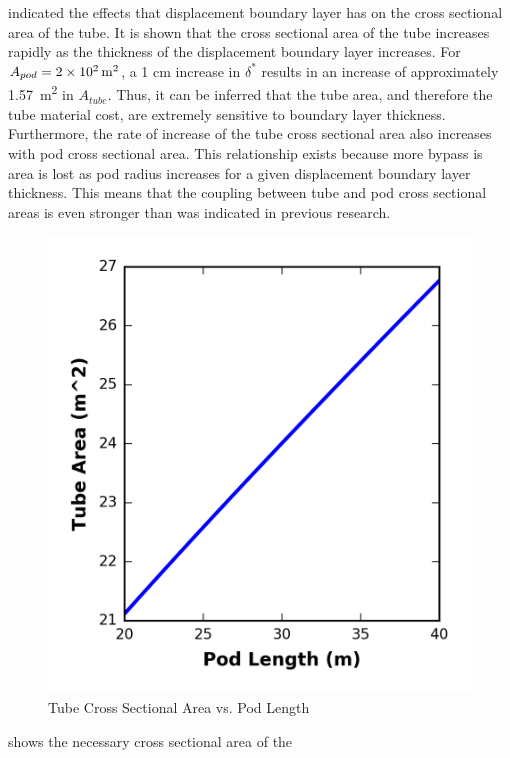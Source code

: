  indicated the effects that
displacement boundary layer has on the cross sectional area of the tube.
It is shown that the cross sectional area of the tube increases rapidly as the
thickness of the displacement boundary layer increases.
For $A_{pod} = \SI{2d2}{\metre\squared}$, a 1 cm increase in $\delta^{*}$
results in an increase of approximately \SI{1.57}{\metre\squared} in $A_{tube}$.
Thus, it can be inferred that the tube area, and therefore the tube material cost,
are extremely sensitive to boundary layer thickness. Furthermore, the rate of
increase of the tube cross sectional area also increases with pod cross sectional area.
This relationship exists because more bypass is area is lost as pod radius
increases for a given displacement boundary layer thickness. This means that
the coupling between tube and pod cross sectional areas is even stronger than
was indicated in previous research.
\begin{figure}
	\centering
	\caption{Tube Cross Sectional Area vs. Pod Length}
	\label{fig:tube_area_vs_length}
	\includegraphics{../../images/graphs/boundary_layer_length_trades/Tube_Area_vs_pod_length.png}
\end{figure}
 shows the necessary cross sectional area of the
